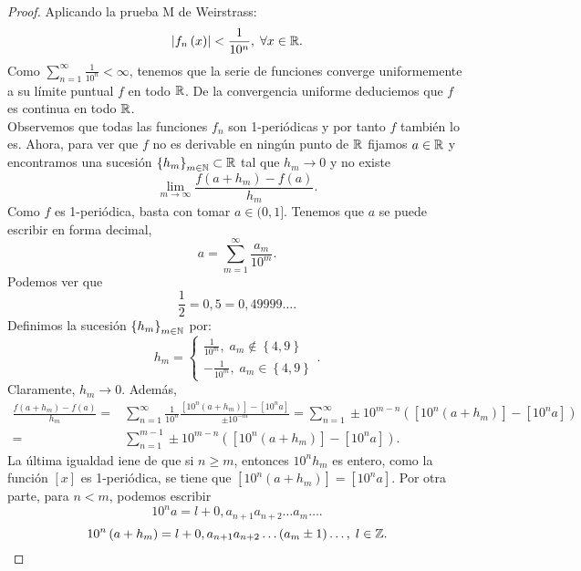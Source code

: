 \begin{proof}
Aplicando la prueba M de Weirstrass:
\[ \left|f_{n}\left(x\right)\right| < \frac{1}{10^{n}}, \; \forall x \in \mathbb{R} .\]
Como $\displaystyle \sum^{\infty}_{n = 1}\frac{1}{10^{n}}<\infty $, tenemos que la serie de funciones converge uniformemente a su límite puntual $\displaystyle f $ en todo $\displaystyle \mathbb{R} $. De la convergencia uniforme deduciemos que $\displaystyle f $ es continua en todo $\displaystyle \mathbb{R} $. \\
Observemos que todas las funciones $\displaystyle f_{n} $ son 1-periódicas y por tanto $\displaystyle f $ también lo es. Ahora, para ver que $\displaystyle f $ no es derivable en ningún punto de $\displaystyle \mathbb{R} $ fijamos $\displaystyle a \in \mathbb{R} $ y encontramos una sucesión $\displaystyle \left\{ h_{m}\right\} _{m\in\mathbb{N}}\subset \mathbb{R} $ tal que $\displaystyle h_{m} \to 0 $ y no existe 
\[\lim_{m \to \infty}\frac{f\left(a+h_{m}\right)-f\left(a\right)}{h_{m}} .\]
Como $\displaystyle f $ es 1-periódica, basta con tomar $\displaystyle a \in (0,1] $. Tenemos que $\displaystyle a $ se puede escribir en forma decimal, 
\[ a = \sum^{\infty}_{m = 1}\frac{a_{m}}{10^{m}} .\]
Podemos ver que 
\[\frac{1}{2} = 0,5 = 0,49999 \ldots .\]
Definimos la sucesión $\displaystyle \left\{ h_{m}\right\} _{m\in\mathbb{N}} $ por:
\[h_{m} =
\begin{cases}
	\frac{1}{10^{m}}, \; a_{m} \not\in \left\{ 4,9\right\} \\
	-\frac{1}{10^{m}}, \; a_{m} \in \left\{ 4,9\right\} 
\end{cases}
.\]
Claramente, $\displaystyle h_{m} \to 0 $. Además, 
\[
\begin{split}
	\frac{f\left(a+h_{m}\right)-f\left(a\right)}{h_{m}} = & \sum^{\infty}_{n = 1}\frac{1}{10^{n}}\frac{\left[10^{n}\left(a+h_{m}\right)\right] -\left[10^{n}a\right] }{\pm10^{-m}} 
	=  \sum^{\infty}_{n = 1}\pm10^{m - n}\left(\left[10^{n}\left(a+h_{m}\right)\right] -\left[10^{n}a\right] \right) \\
	= & \sum^{m - 1}_{n = 1}\pm 10^{m - n}\left(\left[10^{n}\left(a+h_{m}\right)\right] -\left[10^{n}a\right] \right).
\end{split}
\]
La última igualdad iene de que si $\displaystyle n \geq m $, entonces $\displaystyle 10^{n}h_{m} $ es entero, como la función $\displaystyle \left[x\right]  $ es 1-periódica, se tiene que $\displaystyle \left[10^{n}\left(a+h_{m}\right)\right] =\left[10^{n}a\right]  $. Por otra parte, para $\displaystyle n < m $, podemos escribir
\[10^{n}a = l + 0,a_{n+1}a_{n+2} \ldots a_{m} \ldots .\]
\[10^{n}\left(a+h_{m}\right) = l + 0,a_{n+1}a_{n+2} \ldots \left(a_{m}\pm1\right) \ldots, \; l \in \mathbb{Z} .\]

\end{proof}
